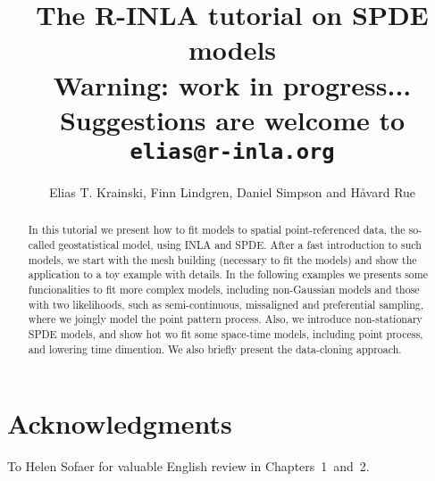 \documentclass[a4paper,11pt]{report}
\title{\textbf{The R-INLA tutorial on SPDE models}\\
Warning: work in progress...\\
Suggestions are welcome to \texttt{elias@r-inla.org}}
\author{Elias T. Krainski, Finn Lindgren, Daniel Simpson and H{\aa}vard Rue}
\begin{document}
\maketitle

\begin{abstract}
  In this tutorial we present how to fit models 
  to spatial point-referenced data, the so-called 
  geostatistical model, using INLA and SPDE. 
  After a fast introduction to such models, 
  we start with the mesh building 
  (necessary to fit the models) and show the application 
  to a toy example with details. 
  In the following examples we presents some funcionalities 
  to fit more complex models, including non-Gaussian models 
  and those with two likelihoods, such as semi-continuous,  
  missaligned and preferential sampling, where we joingly model 
  the point pattern process. Also, we introduce 
  non-stationary SPDE models, and show hot wo fit 
  some space-time models, including point process, 
  and lowering time dimention. 
  We also briefly present the data-cloning approach.
\end{abstract} 

\section{Acknowledgments}
To Helen Sofaer for valuable English review in 
Chapters~1~and~2. 

 

\tableofcontents

 

 
 

 
 
 



 


 



\end{document}
